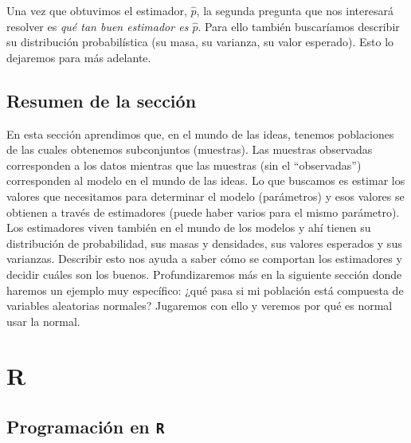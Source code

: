 \documentclass[
]{book}
\begin{document}
Una vez que obtuvimos el estimador, \(\hat{p}\), la segunda pregunta que nos interesará resolver es \emph{qué tan buen estimador es \(\hat{p}\)}. Para ello también buscaríamos describir su distribución probabilística (su masa, su varianza, su valor esperado). Esto lo dejaremos para más adelante.

\hypertarget{resumen-de-la-secciuxf3n}{%
\section{Resumen de la sección}\label{resumen-de-la-secciuxf3n}}

En esta sección aprendimos que, en el mundo de las ideas, tenemos poblaciones de las cuales obtenemos subconjuntos (muestras). Las muestras observadas corresponden a los datos mientras que las muestras (sin el ``observadas'') corresponden al modelo en el mundo de las ideas. Lo que buscamos es estimar los valores que necesitamos para determinar el modelo (parámetros) y esos valores se obtienen a través de estimadores (puede haber varios para el mismo parámetro). Los estimadores viven también en el mundo de los modelos y ahí tienen su distribución de probabilidad, sus masas y densidades, sus valores esperados y sus varianzas. Describir esto nos ayuda a saber cómo se comportan los estimadores y decidir cuáles son los buenos. Profundizaremos más en la siguiente sección donde haremos un ejemplo muy específico: ¿qué pasa si mi población está compuesta de variables aleatorias normales? Jugaremos con ello y veremos por qué es normal usar la normal.

\hypertarget{R}{%
\chapter{R}\label{R}}

\hypertarget{programaciuxf3n-en-r}{%
\section{\texorpdfstring{Programación en \texttt{R}}{Programación en R}}\label{programaciuxf3n-en-r}}
\end{document}

